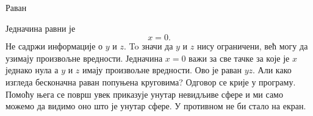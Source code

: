 ﻿\documentclass[en]{./../../common/SurferDesc}%
\begin{document}
\footnotesize
%

\begin{surferPage}
  \begin{surferTitle}Раван\end{surferTitle}
   \begin{surferText}

Једначина равни је \[x=0.\] Не садржи информације о $y$ и $z$. To значи да $y$ и $z$ нису ограничени, већ могу да узимају произвољне вредности.
Једначина $x=0$ важи за све тачке за које је $x$ једнако нула а $y$ и $z$ имају произвољне вредности. Ово је раван $yz$.
\newline \newline
Али како изгледа бесконачна раван попуњена круговима? Одговор се крије у програму. Помоћу њега се површ увек приказује унутар невидљиве сфере и ми само можемо да видимо оно што је унутар сфере. У противном не би стало на екран.

     \end{surferText}
\end{surferPage}

\end{document}
